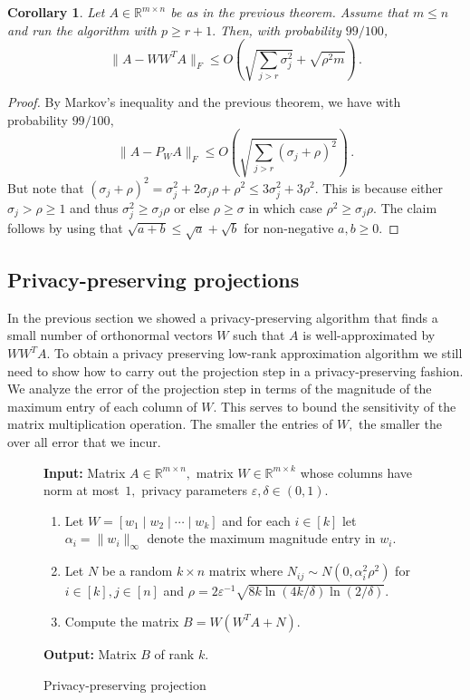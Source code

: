 \documentclass[letterpaper,11pt]{article}
\newtheorem{corollary}[theorem]{Corollary}
\theoremstyle{definition}
\newcommand{\corollarylabel}[1]{\label{cor:#1}}
\newcommand{\figurelabel}[1]{\label{fig:#1}}
\newcommand{\sectionlabel}[1]{\label{sec:#1}}
\newcommand{\mper}{\,.}
\renewcommand{\le}{\leqslant}
\renewcommand{\ge}{\geqslant}
\newcommand{\R}{\mathbb{R}}
\renewcommand{\epsilon}{\varepsilon}
\begin{document}
\begin{corollary}\corollarylabel{range-finder}
Let $A\in\R^{m\times n}$ be as in the previous theorem. Assume that $m\le n$
and run the algorithm with $p\ge r+1.$ Then, with probability $99/100$,
\[
\|A-WW^TA\|_F
\le O\left(\sqrt{\sum_{j>r}\sigma_j^2} + \sqrt{\rho^2m}\right)\mper
\]
\end{corollary}
\begin{proof}
By Markov's inequality and the previous theorem, we have with probability
$99/100,$
\[
\|A-P_WA\|_F
\le O\left(\sqrt{\sum_{j>r}(\sigma_j+\rho)^2}\right)\mper
\]
But note that $(\sigma_j+\rho)^2=\sigma_j^2+2\sigma_j\rho+\rho^2\le
3\sigma_j^2+3\rho^2.$ This is because either $\sigma_j>\rho\ge1$ and thus
$\sigma_j^2\ge\sigma_j\rho$ or else $\rho\ge\sigma$ in which case
$\rho^2\ge\sigma_j\rho.$ The claim follows by using that
$\sqrt{a+b}\le\sqrt{a}+\sqrt{b}$ for non-negative $a,b\ge0.$
\end{proof}

\subsection{Privacy-preserving projections}
\sectionlabel{projection}

In the previous section we showed a privacy-preserving algorithm that finds a small number of orthonormal vectors $W$ such that $A$ is well-approximated by
$WW^TA.$ To obtain a privacy preserving low-rank approximation algorithm we
still need to show how to carry out the projection step in a
privacy-preserving fashion. We analyze the error of the projection
step in terms of the magnitude of the maximum entry of each column of $W.$ This serves to bound the sensitivity of the matrix multiplication operation. The smaller the entries of $W,$ the smaller the over all error that we incur.

\begin{figure}[h]
\begin{boxedminipage}{\textwidth}
{\bf Input:} Matrix $A\in\mathbb{R}^{m\times n},$ matrix
$W\in\R^{m\times k}$ whose columns have norm at most~$1,$
privacy parameters $\epsilon,\delta\in(0,1).$
\begin{enumerate}
\item Let $W=[w_1\mid w_2\mid\cdots\mid w_k]$ and for each $i\in[k]$
let $\alpha_i=\|w_i\|_\infty$ denote the maximum magnitude entry in $w_i.$
\item Let $N$ be a random $k\times n$ matrix where $N_{ij}\sim N(0,\alpha_i^2\rho^2)$
for $i\in[k],j\in[n]$ and $\rho=2\epsilon^{-1}\sqrt{8k\ln(4k/\delta)\ln(2/\delta)}.$
\item Compute the matrix $B=W(W^TA+N).$
\end{enumerate}
{\bf Output:} Matrix $B$ of rank $k.$
\end{boxedminipage}
\caption{Privacy-preserving projection}
\figurelabel{projection}
\end{figure}
\end{document}
